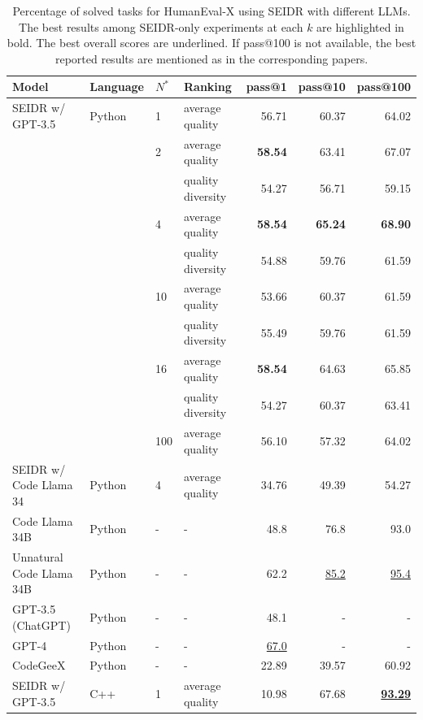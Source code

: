 \begin{table}[htb]
    \centering
    \caption{Percentage of solved tasks for HumanEval-X using SEIDR with different LLMs. The best results among SEIDR-only experiments at each $k$ are highlighted in bold. The best overall scores are underlined. If pass@100 is not available, the best reported results are mentioned as in the corresponding papers. }\small
    \label{tab:generalizability-he}
\begin{adjustbox}{max width=\textwidth}
\begin{tabular}{llllrrr}
\toprule
Model & Language & $N^*$ & Ranking &  pass@1 &  pass@10 &  pass@100 \\
\midrule
SEIDR w/ GPT-3.5 & Python & 1   & average quality &   56.71 &    60.37 &     64.02 \\
&        & 2   & average quality &   \textbf{58.54 }&    63.41 &     67.07 \\
&        &     & quality diversity  &   54.27 &    56.71 &     59.15 \\
&        & 4   & average quality &   \textbf{58.54} &    \textbf{65.24} &     \textbf{68.90} \\
&        &     & quality diversity  &   54.88 &    59.76 &     61.59 \\
&        & 10  & average quality &   53.66 &    60.37 &     61.59 \\
&        &     & quality diversity  &   55.49 &    59.76 &     61.59 \\
&        & 16  & average quality &   \textbf{58.54} &    64.63 &     65.85 \\
&        &     & quality diversity  &   54.27 &    60.37 &     63.41 \\
&        & 100 & average quality &   56.10 &    57.32 &     64.02 \\
\midrule
SEIDR w/ Code Llama 34 & Python & 4 &  average quality &   34.76 &    49.39 &     54.27 \\
\midrule
Code Llama 34B & Python & - &  - &  48.8  &  76.8   &    93.0 \\
Unnatural Code Llama 34B & Python & - &  - &  62.2  &  \underline{85.2}   &    \underline{95.4} \\
GPT-3.5 (ChatGPT) & Python & - &  - &  48.1  &  -   &    - \\
GPT-4 & Python & -&  - & \underline{67.0}   &  -   &    - \\
CodeGeeX & Python & - &  - &  22.89  &  39.57   &    60.92 \\
\midrule
 SEIDR w/ GPT-3.5 & C++ & 1   & average quality &   10.98 &    67.68 &     \underline{\textbf{93.29}} \\

\end{tabular}
\end{adjustbox}
\end{table}
